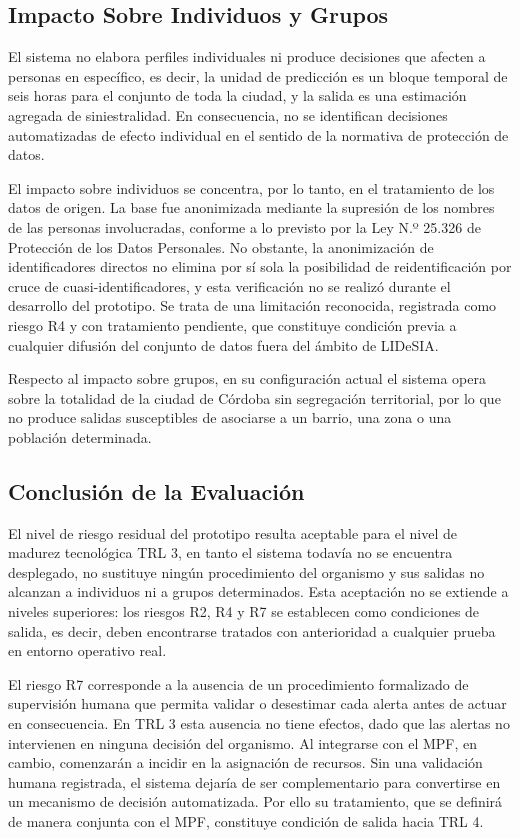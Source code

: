 \subsection{Impacto Sobre Individuos y Grupos}\label{impacto-sobre-individuos-y-grupos}

El sistema no elabora perfiles individuales ni produce decisiones que afecten a personas en específico, es decir, la unidad de predicción es un bloque temporal de seis horas para el conjunto de toda la ciudad, y la salida es una estimación agregada de siniestralidad. En consecuencia, no se identifican decisiones automatizadas de efecto individual en el sentido de la normativa de protección de datos.

El impacto sobre individuos se concentra, por lo tanto, en el tratamiento de los datos de origen. La base fue anonimizada mediante la supresión de los nombres de las personas involucradas, conforme a lo previsto por la Ley N.º 25.326 de Protección de los Datos Personales. No obstante, la anonimización de identificadores directos no elimina por sí sola la posibilidad de reidentificación por cruce de cuasi-identificadores, y esta verificación no se realizó durante el desarrollo del prototipo. Se trata de una limitación reconocida, registrada como riesgo R4 y con tratamiento pendiente, que constituye condición previa a cualquier difusión del conjunto de datos fuera del ámbito de LIDeSIA.

Respecto al impacto sobre grupos, en su configuración actual el sistema opera sobre la totalidad de la ciudad de Córdoba sin segregación territorial, por lo que no produce salidas susceptibles de asociarse a un barrio, una zona o una población determinada.

\subsection{Conclusión de la Evaluación}\label{conclusiuxf3n-de-la-evaluaciuxf3n}

El nivel de riesgo residual del prototipo resulta aceptable para el nivel de madurez tecnológica TRL 3, en tanto el sistema todavía no se encuentra desplegado, no sustituye ningún procedimiento del organismo y sus salidas no alcanzan a individuos ni a grupos determinados. Esta aceptación no se extiende a niveles superiores: los riesgos R2, R4 y R7 se establecen como condiciones de salida, es decir, deben encontrarse tratados con anterioridad a cualquier prueba en entorno operativo real.

El riesgo R7 corresponde a la ausencia de un procedimiento formalizado de supervisión humana que permita validar o desestimar cada alerta antes de actuar en consecuencia. En TRL 3 esta ausencia no tiene efectos, dado que las alertas no intervienen en ninguna decisión del organismo. Al integrarse con el MPF, en cambio, comenzarán a incidir en la asignación de recursos. Sin una validación humana registrada, el sistema dejaría de ser complementario para convertirse en un mecanismo de decisión automatizada. Por ello su tratamiento, que se definirá de manera conjunta con el MPF, constituye condición de salida hacia TRL 4.

